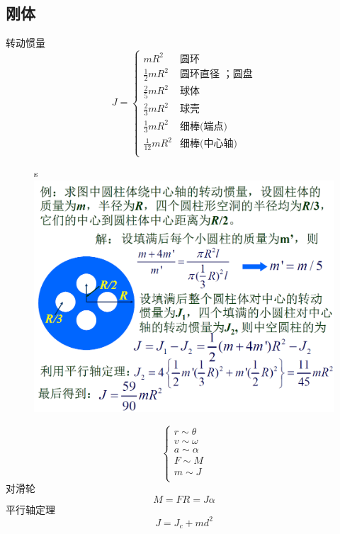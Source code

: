 \documentclass{article}
\begin{document}
    \subsection{刚体}
    转动惯量
    \begin{equation*}
        J=
        \begin{cases}
            mR^2 & \text{圆环}\\
            \frac{1}{2}mR^2& \text{圆环直径 ；圆盘}\\
            \frac{2}{5}mR^2& \text{球体}\\
            \frac{2}{3}mR^2& \text{球壳}\\
            \frac{1}{3}mR^2& \text{细棒(端点)}\\
            \frac{1}{12}mR^2& \text{细棒(中心轴)}\\
        \end{cases}
    \end{equation*}
    \begin{figure}[H]s
        \centering
        \includegraphics[width=.65\textwidth]{figure/fill.png}
    \end{figure}
    \begin{equation*}
        \begin{cases}
            r \sim \theta \\
            v \sim \omega \\
            a \sim \alpha \\
            F \sim M \\
            m \sim J \\
        \end{cases}
    \end{equation*}
    对滑轮
    \[
    M=FR=J \alpha    
    \]
    平行轴定理
    \[
        J=J_c+md^2  
    \]
\end{document}
